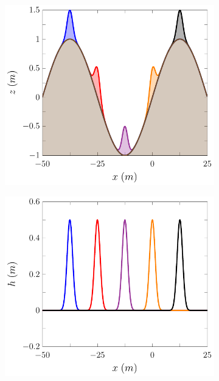 \begin{figure}
	\centering
	\begin{subfigure}{0.5\textwidth}
		\includegraphics[width=\textwidth]{./chp5/figures/Forced/Dry/FDVMw.pdf}
		\vspace{0.5cm}
	\end{subfigure}%
	\begin{subfigure}{0.5\textwidth}
		\includegraphics[width=\textwidth]{./chp5/figures/Forced/Dry/FDVMh.pdf}

\end{subfigure}
\end{figure}

